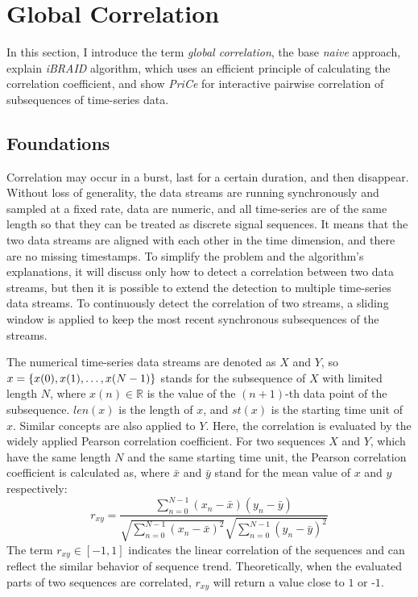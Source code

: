 \section{Global Correlation}
\label{sec:2}
In this section, I introduce the term \textit{global correlation}, the base \textit{naive} approach, explain \textit{iBRAID} algorithm, which uses an efficient principle of calculating the correlation coefficient, and show \textit{PriCe} for interactive pairwise correlation of subsequences of time-series data.
\subsection{Foundations}
Correlation may occur in a burst, last for a certain duration, and then disappear. Without loss of generality, the data streams are running synchronously and sampled at a fixed rate, data are numeric, and all time-series are of the same length so that they can be treated as discrete signal sequences. It means that the two data streams are aligned with each other in the time dimension, and there are no missing timestamps. To simplify the problem and the algorithm's explanations, it will discuss only how to detect a correlation between two data streams, but then it is possible to extend the detection to multiple time-series data streams. To continuously detect the correlation of two streams, a sliding window is applied to keep the most recent synchronous subsequences of the streams.~\cite{ref2} \newline

The numerical time-series data streams are denoted as $X$ and $Y$, so $x = \{x(0), \\x(1),\ldots,x(N- 1)\}$ stands for the subsequence of $X$ with limited length $N$, where $x(n) \in \mathbb{R}$ is the value of the $(n + 1)$-th data point of the subsequence. $len(x)$ is the length of $x$, and $st(x)$ is the starting time unit of $x$. Similar concepts are also applied to $Y$. Here, the correlation is evaluated by the widely applied Pearson correlation coefficient. For two sequences $X$ and $Y$, which have the same length $N$ and the same starting time unit, the Pearson correlation coefficient is calculated as, where $\bar{x}$ and $\bar{y}$ stand for the mean value of $x$ and $y$ respectively:
\begin{equation}
\label{equ:1}
r_{x y}=\frac{\sum_{n=0}^{N-1}\left(x_{n}-\bar{x}\right)\left(y_{n}-\bar{y}\right)}{\sqrt{\sum_{n=0}^{N-1}\left(x_{n}-\bar{x}\right)^{2}} \sqrt{\sum_{n=0}^{N-1}\left(y_{n}-\bar{y}\right)^{2}}}
\end{equation}
The term $r_{x y} \in[-1,1]$ indicates the linear correlation of the sequences and can reflect the similar behavior of sequence trend. Theoretically, when the evaluated parts of two sequences are correlated, $r_{x y}$ will return a value close to $\mbox{1 or -1}$.


